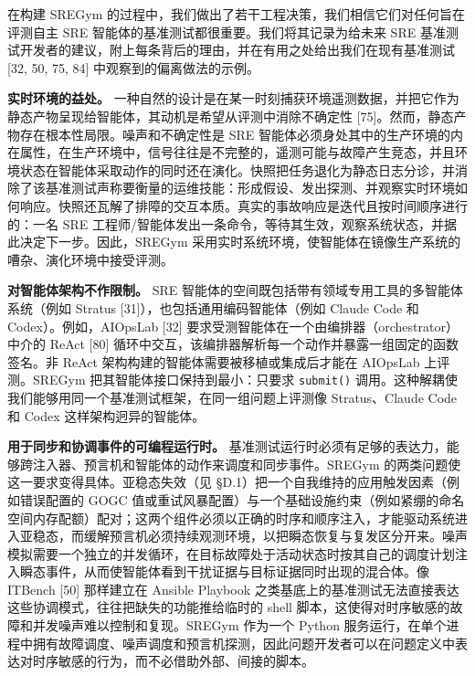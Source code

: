 \documentclass[11pt,UTF8,fontset=fandol]{ctexart}
\begin{document}
在构建 SREGym 的过程中，我们做出了若干工程决策，我们相信它们对任何旨在评测自主 SRE 智能体的基准测试都很重要。我们将其记录为给未来 SRE 基准测试开发者的建议，附上每条背后的理由，并在有用之处给出我们在现有基准测试 [32, 50, 75, 84] 中观察到的偏离做法的示例。

\textbf{实时环境的益处。} 一种自然的设计是在某一时刻捕获环境遥测数据，并把它作为静态产物呈现给智能体，其动机是希望从评测中消除不确定性 [75]。然而，静态产物存在根本性局限。噪声和不确定性是 SRE 智能体必须身处其中的生产环境的内在属性，在生产环境中，信号往往是不完整的，遥测可能与故障产生竞态，并且环境状态在智能体采取动作的同时还在演化。快照把任务退化为静态日志分诊，并消除了该基准测试声称要衡量的运维技能：形成假设、发出探测、并观察实时环境如何响应。快照还瓦解了排障的交互本质。真实的事故响应是迭代且按时间顺序进行的：一名 SRE 工程师/智能体发出一条命令，等待其生效，观察系统状态，并据此决定下一步。因此，SREGym 采用实时系统环境，使智能体在镜像生产系统的嘈杂、演化环境中接受评测。

\textbf{对智能体架构不作限制。} SRE 智能体的空间既包括带有领域专用工具的多智能体系统（例如 Stratus [31]），也包括通用编码智能体（例如 Claude Code 和 Codex）。例如，AIOpsLab [32] 要求受测智能体在一个由编排器（orchestrator）中介的 ReAct [80] 循环中交互，该编排器解析每一个动作并暴露一组固定的函数签名。非 ReAct 架构构建的智能体需要被移植或集成后才能在 AIOpsLab 上评测。SREGym 把其智能体接口保持到最小：只要求 \texttt{submit()} 调用。这种解耦使我们能够用同一个基准测试框架，在同一组问题上评测像 Stratus、Claude Code 和 Codex 这样架构迥异的智能体。

\textbf{用于同步和协调事件的可编程运行时。} 基准测试运行时必须有足够的表达力，能够跨注入器、预言机和智能体的动作来调度和同步事件。SREGym 的两类问题使这一要求变得具体。亚稳态失效（见 §D.1）把一个自我维持的应用触发因素（例如错误配置的 GOGC 值或重试风暴配置）与一个基础设施约束（例如紧绷的命名空间内存配额）配对；这两个组件必须以正确的时序和顺序注入，才能驱动系统进入亚稳态，而缓解预言机必须持续观测环境，以把瞬态恢复与复发区分开来。噪声模拟需要一个独立的并发循环，在目标故障处于活动状态时按其自己的调度计划注入瞬态事件，从而使智能体看到干扰证据与目标证据同时出现的混合体。像 ITBench [50] 那样建立在 Ansible Playbook 之类基底上的基准测试无法直接表达这些协调模式，往往把缺失的功能推给临时的 shell 脚本，这使得对时序敏感的故障和并发噪声难以控制和复现。SREGym 作为一个 Python 服务运行，在单个进程中拥有故障调度、噪声调度和预言机探测，因此问题开发者可以在问题定义中表达对时序敏感的行为，而不必借助外部、间接的脚本。
\end{document}
